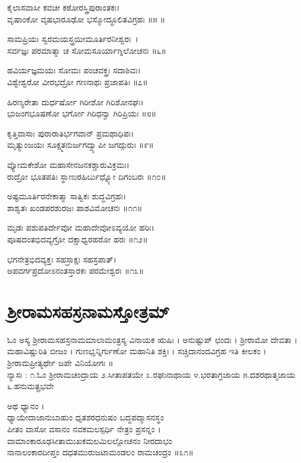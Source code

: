 ಕೈಲಾಸವಾಸೀ ಕವಚೀ ಕಠೋರಸ್ತ್ರಿಪುರಾಂತಕಃ।\\
ವೃಷಾಂಕೋ ವೃಷಭಾರೂಢೋ ಭಸ್ಮೋದ್ಧೂಲಿತವಿಗ್ರಹಃ ॥೫ ॥

ಸಾಮಪ್ರಿಯಃ ಸ್ವರಮಯಸ್ತ್ರಯೀಮೂರ್ತಿರನೀಶ್ವರಃ~।\\
ಸರ್ವಜ್ಞಃ ಪರಮಾತ್ಮಾ ಚ ಸೋಮಸೂರ್ಯಾಗ್ನಿಲೋಚನಃ ॥೬॥

ಹವಿರ್ಯಜ್ಞಮಯಃ ಸೋಮಃ ಪಂಚವಕ್ತ್ರಃ ಸದಾಶಿವಃ।\\
ವಿಶ್ವೇಶ್ವರೋ ವೀರಭದ್ರೋ ಗಣನಾಥಃ ಪ್ರಜಾಪತಿಃ ॥೭॥

ಹಿರಣ್ಯರೇತಾ ದುರ್ಧರ್ಷೋ ಗಿರೀಶೋ ಗಿರಿಶೋನಘಃ।\\
ಭುಜಂಗಭೂಷಣೋ ಭರ್ಗೋ ಗಿರಿಧನ್ವಾ ಗಿರಿಪ್ರಿಯಃ ॥೮॥

ಕೃತ್ತಿವಾಸಾಃ ಪುರಾರಾತಿರ್ಭಗವಾನ್ ಪ್ರಮಥಾಧಿಪಃ।\\
ಮೃತ್ಯುಂಜಯಃ ಸೂಕ್ಷ್ಮತನುರ್ಜಗದ್ವ್ಯಾಪೀ ಜಗದ್ಗುರುಃ ॥೯॥

ವ್ಯೋಮಕೇಶೋ ಮಹಾಸೇನಜನಕಶ್ಚಾರುವಿಕ್ರಮಃ।\\
ರುದ್ರೋ ಭೂತಪತಿಃ ಸ್ಥಾಣುರಹಿರ್ಬುಧ್ನ್ಯೋ ದಿಗಂಬರಃ ॥೧೦॥

ಅಷ್ಟಮೂರ್ತಿರನೇಕಾತ್ಮಾ ಸಾತ್ವಿಕಃ ಶುದ್ಧವಿಗ್ರಹಃ।\\
ಶಾಶ್ವತಃ ಖಂಡಪರಶುರಜಃ ಪಾಶವಿಮೋಚನಃ ॥೧೧॥

ಮೃಡಃ ಪಶುಪತಿರ್ದೇವೋ ಮಹಾದೇವೋಽವ್ಯಯೋ ಹರಿಃ।\\
ಪೂಷದಂತಭಿದವ್ಯಗ್ರೋ ದಕ್ಷಾಧ್ವರಹರೋ ಹರಃ ॥೧೨॥

ಭಗನೇತ್ರಭಿದವ್ಯಕ್ತಃ ಸಹಸ್ರಾಕ್ಷಃ ಸಹಸ್ರಪಾತ್।\\
ಅಪವರ್ಗಪ್ರದೋಽನಂತಸ್ತಾರಕಃ ಪರಮೇಶ್ವರಃ ॥೧೩॥

\section{ಶ್ರೀರಾಮಸಹಸ್ರನಾಮಸ್ತೋತ್ರಮ್}
ಓಂ ಅಸ್ಯ ಶ್ರೀರಾಮಸಹಸ್ರನಾಮಮಾಲಾಮಂತ್ರಸ್ಯ ವಿನಾಯಕ ಋಷಿಃ । ಅನುಷ್ಟುಪ್ ಛಂದಃ । ಶ್ರೀರಾಮೋ ದೇವತಾ । ಮಹಾವಿಷ್ಣುರಿತಿ ಬೀಜಂ । ಗುಣಭೃನ್ನಿರ್ಗುಣೋ ಮಹಾನಿತಿ ಶಕ್ತಿಃ । ಸಚ್ಚಿದಾನಂದವಿಗ್ರಹ ಇತಿ ಕೀಲಕಂ । ಶ್ರೀರಾಮಪ್ರೀತ್ಯರ್ಥೇ ಜಪೇ ವಿನಿಯೋಗಃ ॥\\
ನ್ಯಾಸಃ : ೧.ಓಂ ಶ್ರೀರಾಮಚಂದ್ರಾಯ ೨.ಸೀತಾಪತಯೇ ೩.ರಘುನಾಥಾಯ ೪.ಭರತಾಗ್ರಜಾಯ  ೫.ದಶರಥಾತ್ಮಜಾಯ  ೬.ಹನುಮತ್ಪ್ರಭವೇ

ಅಥ ಧ್ಯಾನಂ ।\\
ಧ್ಯಾಯೇದಾಜಾನುಬಾಹುಂ ಧೃತಶರಧನುಷಂ ಬದ್ಧಪದ್ಮಾಸನಸ್ಥಂ\\
ಪೀತಂ ವಾಸೋ ವಸಾನಂ ನವಕಮಲಸ್ಪರ್ಧಿ ನೇತ್ರಂ ಪ್ರಸನ್ನಂ ।\\
ವಾಮಾಂಕಾರೂಢಸೀತಾಮುಖಕಮಲಮಿಲಲ್ಲೋಚನಂ ನೀರದಾಭಂ\\
ನಾನಾಲಂಕಾರದೀಪ್ತಂ ದಧತಮುರುಜಟಾಮಂಡಲಂ ರಾಮಚಂದ್ರಂ ॥೩೧॥

